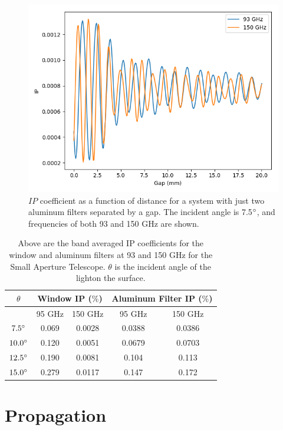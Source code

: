\documentclass{article}
\theoremstyle{remark}
\begin{document}
\begin{figure}[t!]
	\centering
  \includegraphics[width=.8\linewidth]{ip_vs_gap_filter_only.png}
  \caption{$IP$ coefficient as a function of distance for a system with just two aluminum filters separated by a gap.
  The incident angle is 7.5$\degree$, and frequencies of both 93 and 150 GHz are shown.
  }
  \label{fig:IP_vs_distance}
\end{figure}



\begin{table}[h]
\centering

\begin{tabular}{|c|c|c|c|c|}
\hline
$\theta $       & \multicolumn{2}{|c|}{Window IP ($\%$)} & \multicolumn{2}{|c|}{Aluminum Filter IP ($\%$)}           \\
\hline
 & 95 GHz & 150 GHz & 95 GHz & 150 GHz\\
 \hline
$7.5   \degree$ & 0.069 & 0.0028  & 0.0388  & 0.0386  \\
$10.0  \degree$ & 0.120 & 0.0051  & 0.0679  & 0.0703  \\
$12.5  \degree$ & 0.190 & 0.0081  & 0.104   & 0.113   \\
$15.0  \degree$ & 0.279 & 0.0117  & 0.147   & 0.172   \\
\hline
\end{tabular}
\caption{ Above are the band averaged IP coefficients for the window and aluminum filters at 93 and 150 GHz for the Small Aperture Telescope.
 $\theta$ is the incident angle of the lighton the surface.
}
\label{table:IP_coeffs}
\end{table}

\section{Propagation}
\end{document}
